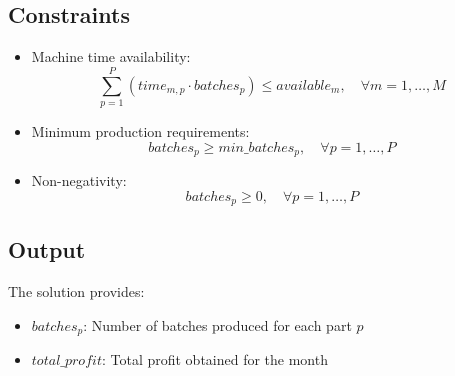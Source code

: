 \documentclass{article}
\begin{document}
\subsection*{Constraints}
\begin{itemize}
    \item Machine time availability:
    \begin{equation}
        \sum_{p=1}^{P} (time_{m,p} \cdot batches_{p}) \leq available_{m}, \quad \forall m = 1, \ldots, M
    \end{equation}
    \item Minimum production requirements:
    \begin{equation}
        batches_{p} \geq min\_batches_{p}, \quad \forall p = 1, \ldots, P
    \end{equation}
    \item Non-negativity:
    \begin{equation}
        batches_{p} \geq 0, \quad \forall p = 1, \ldots, P
    \end{equation}
\end{itemize}

\subsection*{Output}
The solution provides:
\begin{itemize}
    \item $batches_{p}$: Number of batches produced for each part $p$
    \item $total\_profit$: Total profit obtained for the month
\end{itemize}
\end{document}
